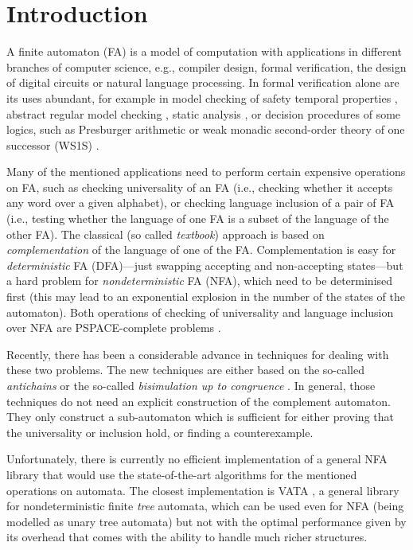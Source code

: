 \chapter{Introduction}
\label{introduction}
A finite automaton (FA) is a model of computation with applications in different branches of computer science, e.g., compiler design, formal verification, 
the design of digital circuits or natural language processing. In formal verification alone are its uses abundant, 
for example in model checking of safety temporal properties \cite{principles}, abstract regular model checking \cite{armc}, static analysis \cite{metal}, 
or decision procedures of some logics, such as Presburger arithmetic or weak 
monadic second-order theory of one successor (WS1S) \cite{mona}.

Many of the mentioned applications need to perform certain expensive operations on FA, such as checking universality of an FA (i.e., checking whether it
accepts any word over a given alphabet), or checking language inclusion of a pair of FA (i.e., testing whether the language of one FA is a subset of the language
of the other FA). The classical (so called \emph{textbook}) approach is based on \emph{complementation} of the language of one of the FA. 
Complementation is easy for 
\emph{deterministic} FA (DFA)---just swapping accepting and non-accepting states---but a hard problem for \emph{nondeterministic} FA (NFA), which need 
to be determinised first (this may lead to an exponential explosion in the number of the states of the automaton). 
Both operations of checking of universality and language inclusion over NFA are PSPACE-complete problems \cite{cav06}.

Recently, there has been a considerable advance in techniques for dealing with these two problems. The new techniques are either based on the so-called 
\emph{antichains} \cite{cav06,tacas10} or the so-called \emph{bisimulation up to congruence} \cite{popl13}. 
In general, those techniques do not need an explicit construction of the complement
automaton. They only construct a sub-automaton which is sufficient for either proving that the universality or inclusion hold, or finding a counterexample.

Unfortunately, there is currently no efficient implementation of a general NFA library that would use the state-of-the-art algorithms for the mentioned
operations on automata. The
closest implementation is VATA \cite{libvata}, a general library for nondeterministic finite \emph{tree} automata, which can be used even for NFA (being modelled 
as unary tree automata) but not with the optimal performance given by its overhead that comes with the ability to handle much richer structures. 
 
